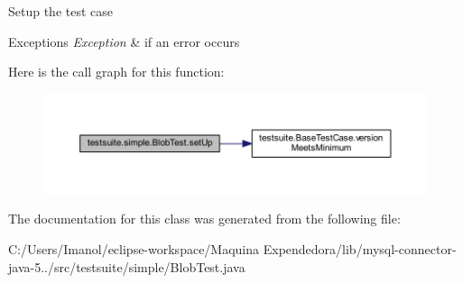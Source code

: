 Setup the test case


\begin{DoxyExceptions}{Exceptions}
{\em Exception} & if an error occurs \\
\hline
\end{DoxyExceptions}
Here is the call graph for this function\+:
\nopagebreak
\begin{figure}[H]
\begin{center}
\leavevmode
\includegraphics[width=350pt]{classtestsuite_1_1simple_1_1_blob_test_a81577d1e5c0481dee0a1b3f5638081df_cgraph}
\end{center}
\end{figure}


The documentation for this class was generated from the following file\+:\begin{DoxyCompactItemize}
\item 
C\+:/\+Users/\+Imanol/eclipse-\/workspace/\+Maquina Expendedora/lib/mysql-\/connector-\/java-\/5../src/testsuite/simple/Blob\+Test.\+java\end{DoxyCompactItemize}
